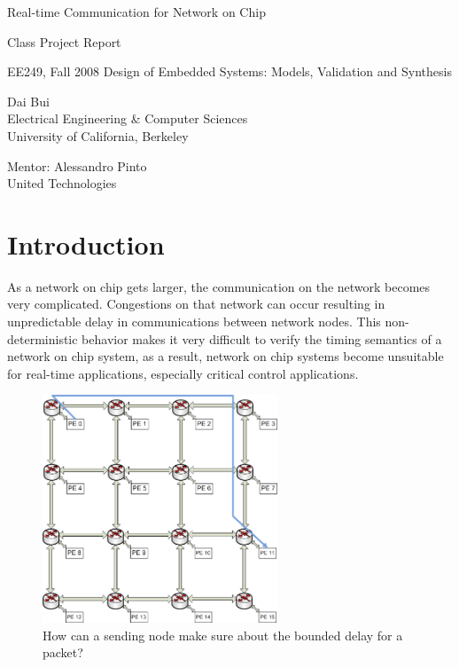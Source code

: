 \documentclass[a4]{article}
\begin{document}
\begin{center}
\huge{Real-time Communication for Network on Chip} \hspace{0.5cm}
\end{center}

\begin{center}

\large{Class Project Report}

\small{EE249, Fall 2008 Design of Embedded Systems: Models, Validation and
Synthesis}
\end{center}

\begin{multicols}{2}{
\begin{center}
Dai Bui\\
Electrical Engineering & Computer Sciences\\
University of California, Berkeley

Mentor: Alessandro Pinto\\
United Technologies
\end{center}
}
\end{multicols}

\section{Introduction}
As a network on chip gets larger, the communication on the network becomes 
very complicated. Congestions on that network can occur resulting in unpredictable 
delay in communications between network nodes. This non-deterministic behavior 
makes it very difficult to verify the timing semantics of a network on chip 
system, as a result, network on chip systems become unsuitable for real-time 
applications, especially critical control applications.

\begin{figure}[htp]
\centering
\includegraphics[width=7cm]{pics/NoC0}
\caption[Demand for a hard real-time flow.]
{How can a sending node make sure about the bounded delay for
a packet?}\label{fig:NoCRt}
\end{figure}
\end{document}

